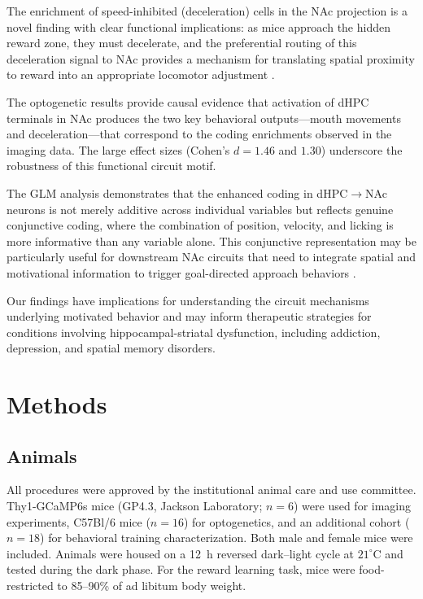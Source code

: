 \documentclass[11pt]{article}
\begin{document}
The enrichment of speed-inhibited (deceleration) cells in the NAc projection is a novel finding with clear functional implications: as mice approach the hidden reward zone, they must decelerate, and the preferential routing of this deceleration signal to NAc provides a mechanism for translating spatial proximity to reward into an appropriate locomotor adjustment \citep{pennartz2011hippocampalnac, mogenson1980limbic}.

The optogenetic results provide causal evidence that activation of dHPC terminals in NAc produces the two key behavioral outputs---mouth movements and deceleration---that correspond to the coding enrichments observed in the imaging data. The large effect sizes (Cohen's $d = 1.46$ and $1.30$) underscore the robustness of this functional circuit motif.

The GLM analysis demonstrates that the enhanced coding in dHPC$\to$NAc neurons is not merely additive across individual variables but reflects genuine conjunctive coding, where the combination of position, velocity, and licking is more informative than any variable alone. This conjunctive representation may be particularly useful for downstream NAc circuits that need to integrate spatial and motivational information to trigger goal-directed approach behaviors \citep{sosa2018navigating, stuber2010excitatory}.

Our findings have implications for understanding the circuit mechanisms underlying motivated behavior and may inform therapeutic strategies for conditions involving hippocampal-striatal dysfunction, including addiction, depression, and spatial memory disorders.

\section{Methods}

\subsection{Animals}
All procedures were approved by the institutional animal care and use committee. Thy1-GCaMP6s mice (GP4.3, Jackson Laboratory; $n = 6$) were used for imaging experiments, C57Bl/6 mice ($n = 16$) for optogenetics, and an additional cohort ($n = 18$) for behavioral training characterization. Both male and female mice were included. Animals were housed on a 12~h reversed dark--light cycle at $21^\circ$C and tested during the dark phase. For the reward learning task, mice were food-restricted to 85--90\% of ad libitum body weight.
\end{document}
